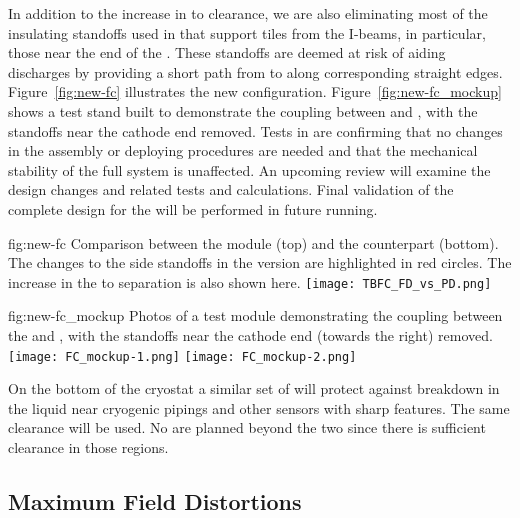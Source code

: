 In addition to the increase in  to  clearance, we are also eliminating most of the insulating standoffs used in  that support  tiles from the  I-beams, in particular, those near the  end of the .  These standoffs  are deemed at risk of aiding discharges by providing a short path from  to  along corresponding straight edges.  Figure~\ref{fig:new-fc} illustrates the new configuration. Figure~\ref{fig:new-fc_mockup} shows a test stand built to demonstrate the coupling between  and , with the standoffs near the cathode end removed. Tests in  are confirming that no changes in the assembly or deploying procedures are needed and that the mechanical stability of the full system is unaffected. An upcoming review will examine the design changes and related tests and calculations. Final validation of the complete  design for the  will be performed in future  running.

\begin{dunefigure}
{fig:new-fc}
{Comparison between the   module (top) and the  counterpart (bottom).  The changes to the  side standoffs in the  version are highlighted in red circles.  The increase in the  to  separation is also shown here.} 
\texttt{[image: TBFC\_FD\_vs\_PD.png]}
\end{dunefigure}

\begin{dunefigure}
{fig:new-fc_mockup}
{Photos of a test module demonstrating the coupling between the   and , with the standoffs near the cathode end (towards the right) removed.} %
\texttt{[image: FC\_mockup-1.png]}
\texttt{[image: FC\_mockup-2.png]}
\end{dunefigure}

On the bottom of the cryostat a similar set of  %
will protect against %
breakdown in the liquid near cryogenic pipings and other sensors with sharp features. The same clearance will be used. No  are planned beyond the two  since there is sufficient clearance in those regions.  


\subsection{Maximum Field Distortions}
\label{sec:fdsp-hv-des-fc-mfd}

